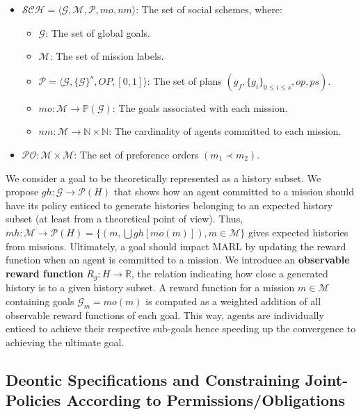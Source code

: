\documentclass[conference]{IEEEtran}
\newcounter{relation}
\begin{document}
\begin{itemize}
    \item $\mathcal{SCH} = \langle \mathcal{G}, \mathcal{M}, \mathcal{P}, mo, nm \rangle$: The set of social schemes, where:
          \begin{itemize}
              \item $\mathcal{G}$: The set of global goals.
              \item $\mathcal{M}$: The set of mission labels.
              \item $\mathcal{P} = \langle \mathcal{G}, \{\mathcal{G}\}^s, OP, [0,1] \rangle$: The set of plans $(g_f, \{g_i\}_{0 \leq i \leq s}, op, ps)$.
              \item $mo: \mathcal{M} \rightarrow \mathbb{P}(\mathcal{G})$: The goals associated with each mission.
              \item $nm: \mathcal{M} \rightarrow \mathbb{N} \times \mathbb{N}$: The cardinality of agents committed to each mission.
          \end{itemize}
    \item $\mathcal{PO}: \mathcal{M} \times \mathcal{M}$: The set of preference orders $(m_1 \prec m_2)$.
\end{itemize}

We consider a goal to be theoretically represented as a history subset. We propose $gh: \mathcal{G} \rightarrow \mathcal{P}(H)$ that shows how an agent committed to a mission should have its policy enticed to generate histories belonging to an expected history subset (at least from a theoretical point of view). Thus, $mh: \mathcal{M} \rightarrow \mathcal{P}(H) = \{(m,\bigcup gh[mo(m)]), m \in \mathcal{M}\}$ gives expected histories from missions. Ultimately, a goal should impact MARL by updating the reward function when an agent is committed to a mission. We introduce an \textbf{observable reward function} $R_{g}: H \rightarrow \mathbb{R}$, the relation indicating how close a generated history is to a given history subset. A reward function for a mission $m \in \mathcal{M}$ containing goals $\mathcal{G}_{m} = mo(m)$ is computed as a weighted addition of all observable reward functions of each goal. This way, agents are individually enticed to achieve their respective sub-goals hence speeding up the convergence to achieving the ultimate goal.

\subsection{Deontic Specifications and Constraining Joint-Policies According to Permissions/Obligations}
\end{document}
